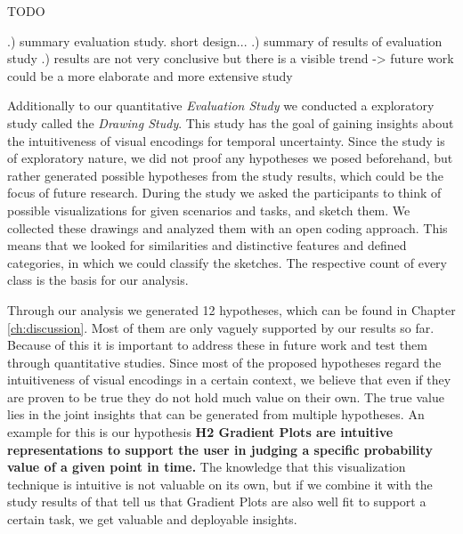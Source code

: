 TODO 

.) summary evaluation study. short design...
.) summary of results of evaluation study
.) results are not very conclusive but there is a visible trend -> future work could be a more elaborate and more extensive study


Additionally to our quantitative \textit{Evaluation Study} we conducted a exploratory study called the \textit{Drawing Study}. This study has the goal of gaining insights about the intuitiveness of visual encodings for temporal uncertainty. Since the study is of exploratory nature, we did not proof any hypotheses we posed beforehand, but rather generated possible hypotheses from the study results, which could be the focus of future research. During the study we asked the participants to think of possible visualizations for given scenarios and tasks, and sketch them. We collected these drawings and analyzed them with an open coding approach. This means that we looked for similarities and distinctive features and defined categories, in which we could classify the sketches. The respective count of every class is the basis for our analysis.\par \medskip

Through our analysis we generated 12 hypotheses, which can be found in Chapter \ref{ch:discussion}. Most of them are only vaguely supported by our results so far. Because of this it is important to address these in future work and test them through quantitative studies. Since most of the proposed hypotheses regard the intuitiveness of visual encodings in a certain context, we believe that even if they are proven to be true they do not hold much value on their own. The true value lies in the joint insights that can be generated from multiple hypotheses. An example for this is our hypothesis \textbf{H2 Gradient Plots are intuitive representations to support the user in judging a specific probability value of a given point in time.} The knowledge that this visualization technique is intuitive is not valuable on its own, but if we combine it with the study results of \citet{gschwandtner2016visual} that tell us that Gradient Plots are also well fit to support a certain task, we get valuable and deployable insights. \par \medskip

